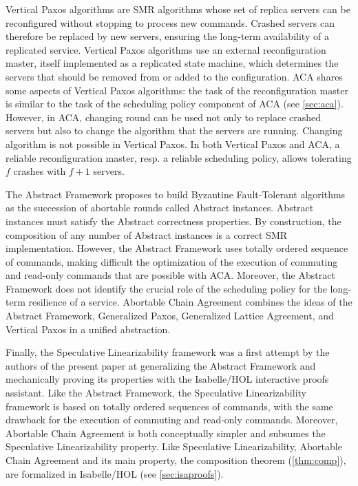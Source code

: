 Vertical Paxos algorithms 
\cite{LamportMalkhiZhou09VerticalPaxosPrimarybackupReplication} are SMR algorithms
whose set of replica servers can be reconfigured without stopping to process new
commands. Crashed servers can therefore be replaced by new servers, ensuring the
long-term availability of a replicated service.
Vertical Paxos algorithms use an external reconfiguration master, itself
implemented as a replicated state machine, which determines the servers that should
be removed from or added to the configuration.
ACA shares some aspects of Vertical Paxos algorithms: the task of the
reconfiguration master is similar to the task of the scheduling policy
component of ACA (see \cref{sec:aca}).
However, in ACA, changing round can be used not only to replace crashed servers
but also to change the algorithm that the servers are running. 
Changing algorithm is not possible in Vertical Paxos.
In both Vertical Paxos and ACA, a reliable reconfiguration master, resp. a
reliable scheduling policy, allows tolerating $f$ crashes with $f+1$ servers.

The Abstract Framework \cite{GuerraouiETAL10Next700BftProtocols} proposes to
build Byzantine Fault-Tolerant algorithms as the succession of abortable rounds
called Abstract instances. Abstract instances must satisfy the Abstract
correctness properties. By construction, the composition of any number of
Abstract instances is a correct SMR implementation. However, the Abstract
Framework uses totally ordered sequence of commands, making difficult the
optimization of the execution of commuting and read-only commands that are
possible with ACA.  Moreover, the Abstract Framework does not identify the
crucial role of the scheduling policy for the long-term resilience of a service.
Abortable Chain Agreement combines the ideas of the Abstract Framework,
Generalized Paxos, Generalized Lattice Agreement, and Vertical Paxos in a
unified abstraction. 

Finally, the Speculative Linearizability framework
\cite{GuerraouiKuncakLosa12SpeculativeLinearizability} was a first
attempt by the authors of the present paper at generalizing the
Abstract Framework and mechanically proving its properties with the
Isabelle/HOL interactive
proofs assistant.  Like the Abstract Framework, the
Speculative Linearizability framework is based on totally ordered
sequences of commands, with the same drawback for the execution of
commuting and read-only commands. Moreover, Abortable Chain Agreement is both
conceptually simpler and subsumes the Speculative Linearizability
property.  Like Speculative Linearizability, Abortable Chain Agreement
and its main property, the composition theorem (\cref{thm:comp}), are
formalized in Isabelle/HOL (see \cref{sec:isaproofs}).

